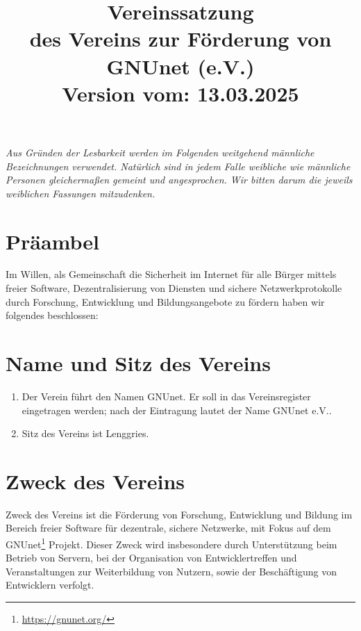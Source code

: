 \documentclass[german,a4paper]{article} %
\title{Vereinssatzung\\des Vereins zur F\"orderung von GNUnet (e.V.)\\\small{Version vom: 13.03.2025}}
\date{}
\newenvironment{enumpar}{%
  \renewcommand{\labelenumi}{\theenumi}%
  \renewcommand{\theenumi}{(\arabic{enumi})}%
  \renewcommand{\labelenumii}{\theenumii}%
  \renewcommand{\theenumii}{(\alph{enumii})}%
  \begin{enumerate}}
{\end{enumerate}}
\begin{document}
\maketitle \textit{\small{Aus Gründen der Lesbarkeit werden im
    Folgenden weitgehend männliche Bezeichnungen verwendet. Natürlich
    sind in jedem Falle weibliche wie männliche Personen gleichermaßen
    gemeint und angesprochen. Wir bitten darum die jeweils weiblichen
    Fassungen mitzudenken.}}

\section*{Präambel}
Im Willen, als Gemeinschaft die Sicherheit im Internet f\"ur alle
B\"urger mittels freier Software, Dezentralisierung von Diensten und
sichere Netzwerkprotokolle durch Forschung, Entwicklung und
Bildungsangebote zu f\"ordern haben wir folgendes beschlossen: \par

\section{Name und Sitz des Vereins}
\begin{enumpar}

\item Der Verein führt den Namen \glqq GNUnet\grqq . Er soll in das Vereinsregister eingetragen werden; nach der Eintragung lautet der Name \glqq GNUnet e.V.\grqq.
\item Sitz des Vereins ist Lenggries.
\end{enumpar}

\section{Zweck des Vereins}

Zweck des Vereins ist die F\"orderung von Forschung, Entwicklung und
Bildung im Bereich freier Software f\"ur dezentrale, sichere Netzwerke,
mit Fokus auf dem GNUnet\footnote{\url{https://gnunet.org/}} Projekt.  Dieser
Zweck wird insbesondere durch Unterst\"utzung beim Betrieb
von Servern, bei der Organisation von Entwicklertreffen und
Veranstaltungen zur Weiterbildung von Nutzern, sowie der
Besch\"aftigung von Entwicklern verfolgt.
\end{document}
